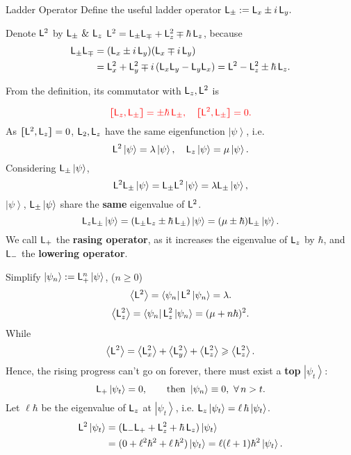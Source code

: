 \documentclass{article}
\newcommand{\ko}[1]{\hspace{-#1 pt}}%
\newcommand{\ave}[1]{\left\langle #1\right\rangle}%
\newcommand{\bra}[1]{\left\langle #1\right\vert}
\newcommand{\ket}[1]{\left\vert #1\right\rangle}
\newcommand{\kh}[1]{\left(#1\right)}
\newcommand{\cmm}[1]{\lfloor\ko{4.45}\lceil #1\rceil\ko{4.45}\rfloor}%
\newcommand{\spark}[1]{\textcolor{red}{#1}}
\begin{document}
\begin{definition}{Ladder Operator}{}
	Define the useful ladder operator $\mathsf L_\pm:=\mathsf L_x\pm i\,\mathsf L_y.$
	\begin{example}{Denote $\mathsf L^2$ by $\mathsf L_\pm~\&~\mathsf L_z$}{}
		$\mathsf L^2=\mathsf L_\pm\mathsf L_\mp+\mathsf L_z^2\mp\hbar\,\mathsf L_z$, because
		\begin{align*}
			\mathsf L_\pm\mathsf L_\mp & =(\mathsf L_x\pm i\,\mathsf L_y)(\mathsf L_x\mp i\,\mathsf L_y)                                      \\
			               & =\mathsf L_x^2+\mathsf L_y^2\mp i\,(\mathsf L_x\mathsf L_y-\mathsf L_y\mathsf L_x)=\mathsf L^2-\mathsf L_z^2\pm\hbar\,\mathsf L_z.
		\end{align*}
	\end{example}
	From the definition, its commutator with $\mathsf L_z,\mathsf L^2$ is
	\iffalse
		\begin{align*}
			[\sL_z,\sL_\pm] & =[\sL_z,\sL_x]\pm i[\sL_z,\sL_y]                              \\
			                & =i\hbar\sL_y\pm i(-i\hbar\sL_x)=\pm\hbar\kh{\sL_x\pm i\sL_y}.
		\end{align*}
		Thus\fi
	$$\spark{\cmm{\sL_z,\sL_\pm}=\pm\hbar\,\sL_\pm,\quad\cmm{\sL^2,\sL_\pm}=0.}$$
	As $\cmm{\sL^2,\sL_z}=0$, $\mathsf L_2,\mathsf L_z$ have the same eigenfunction $\ket\psi$, i.e.
	$$\sL^2\ket\psi=\lambda\ket\psi,\quad\sL_z\ket\psi=\mu\ket\psi.$$
	Considering $\sL_\pm\ket\psi$,
	$$\sL^2\sL_\pm\ket\psi=\sL_\pm\sL^2\ket\psi=\lambda\sL_\pm\ket\psi,$$
	$\ket\psi$, $\sL_\pm\ket\psi$ share the \textbf{same} eigenvalue of $\mathsf L^2$.
	$$\sL_z\sL_\pm\ket\psi=(\sL_\pm\sL_z\pm\hbar\,\sL_\pm)\ket\psi=(\mu\pm\hbar)\sL_\pm\ket\psi.$$
	We call $\mathsf L_+$ the \textbf{rasing operator}, as it increases the eigenvalue of $\mathsf L_z$ by $\hbar$, and $\mathsf L_-$ the \textbf{lowering operator}.
\end{definition}
\noindent Simplify $\ket{\psi_n}:=\sL_+^n\ket\psi$, ($n\geqslant 0$)
$$\ave{\sL^2}=\bra{\psi_n}\sL^2\ket{\psi_n}=\lambda.$$
$$\ave{\sL_z^2}=\bra{\psi_n}\sL_z^2\ket{\psi_n}=(\mu+n\hbar)^2.$$
While
$$\ave{\sL^2}=\ave{\sL_x^2}+\ave{\sL_y^2}+\ave{\sL_z^2}\geqslant\ave{\sL_z^2}.$$
Hence, the rising progress can't go on forever, there must exist a \textbf{top} $\ket{\psi_t}$:
$$\sL_+\ket{\psi_t}=0,\qquad{\rm then}~\ket{\psi_n}\equiv 0,~\forall\,n>t.$$
Let $\ell\hbar$ be the eigenvalue of $\mathsf L_z$ at $\ket{\psi_t}$, i.e. $\sL_z\ket{\psi_t}=\ell\,\hbar\ket{\psi_t}$.
\begin{align*}
	\sL^2\ket{\psi_t} & =(\sL_-\sL_++\sL_z^2+\hbar\,\sL_z)\ket{\psi_t}                                \\
	                  & =(0+\ell^2\hbar^2+\ell\,\hbar^2)\ket{\psi_t}=\ell(\ell+1)\hbar^2\ket{\psi_t}.
\end{align*}
\end{document}
